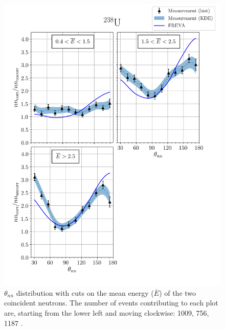 \begin{figure}
\centering
    \includegraphics[width = 1.1\textwidth]{Content/Results/FinalDUResultw_freya1KDE.png}
    \caption{$\theta_{nn}$ distribution with cuts on the mean energy ($\overline{E}$) of the two coincident neutrons.
    The number of events contributing to each plot are, starting from the lower left and moving clockwise: 1009, 756, 1187 .}
    \label{fig:DU(1)}
\end{figure}
